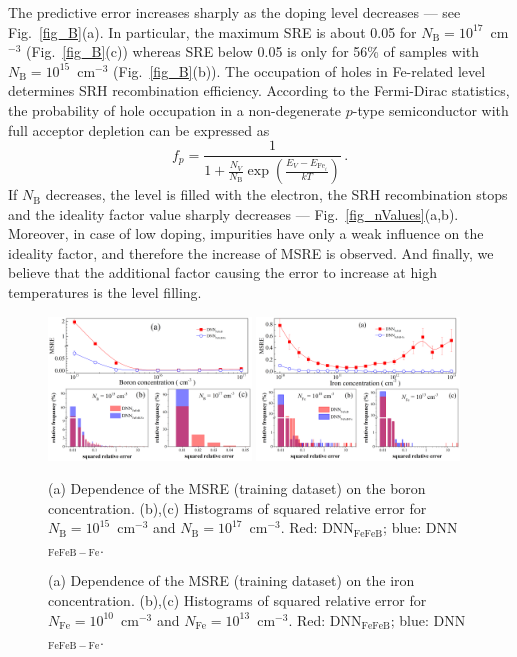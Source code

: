 \documentclass[num-refs]{wiley-article} %
\begin{document}
The predictive error increases sharply as the doping level decreases --- see Fig.~\ref{fig_B}(a).
In particular,  the maximum SRE is about 0.05 for $N_\mathrm{B}=10^{17}$~cm$^{-3}$ (Fig.~\ref{fig_B}(c))
whereas SRE below 0.05 is only for 56\% of samples with $N_\mathrm{B}=10^{15}$~cm$^{-3}$ (Fig.~\ref{fig_B}(b)).
The occupation of holes in Fe-related level determines SRH recombination efficiency.
According to the Fermi-Dirac statistics,
the probability of hole occupation in a non-degenerate $p$-type semiconductor with full acceptor depletion can be expressed as
\begin{equation}
\label{eqfp}
 f_p=\frac{1}{1+\frac{N_V}{N_\mathrm{B}}\exp\left(\frac{E_V-E_{\mathrm{Fe}_i}}{kT}\right)}\,.
\end{equation}
If $N_\mathrm{B}$ decreases, the level is filled with the electron,
the SRH recombination stops
and the ideality factor value sharply decreases  --- Fig.~\ref{fig_nValues}(a,b).
Moreover, in case of low doping,   impurities have only a weak influence
on the ideality factor, and therefore the increase of MSRE is observed.
And finally, we believe that the additional factor causing the error to increase
at high temperatures is the level filling.


\begin{figure}[tb]
\centering
\includegraphics[width=0.48\textwidth]{F6} \hfill
\includegraphics[width=0.48\textwidth]{F7} \\
\parbox[t]{0.48\textwidth}
{\caption{(a) Dependence of the MSRE (training dataset) on the boron concentration.
(b),(c) Histograms of squared  relative error for $N_\mathrm{B}=10^{15}$~cm$^{-3}$ and $N_\mathrm{B}=10^{17}$~cm$^{-3}$.
Red: DNN$_\mathrm{FeFeB}$; blue: DNN$_\mathrm{FeFeB-Fe}$.
}
\label{fig_B}} \hfill
\parbox[t]{0.48\textwidth}{\caption{(a) Dependence of the MSRE (training dataset) on the iron concentration.
(b),(c) Histograms of squared  relative error for $N_\mathrm{Fe}=10^{10}$~cm$^{-3}$ and $N_\mathrm{Fe}=10^{13}$~cm$^{-3}$.
Red: DNN$_\mathrm{FeFeB}$; blue: DNN$_\mathrm{FeFeB-Fe}$.}
\label{fig_Fe}}
\end{figure}
\end{document}
